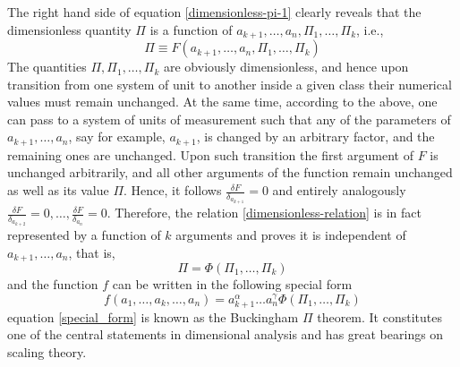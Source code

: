 The right hand side of equation \ref{dimensionless-pi-1} clearly reveals that the dimensionless quantity $\Pi$ is a function of $a_{k+1},\ldots,a_n,\Pi_1,\ldots,\Pi_k$, i.e.,
\begin{equation}
	\Pi \equiv F(a_{k+1}, \ldots, a_n, \Pi_1,\ldots,\Pi_k)
	\label{dimensionless-relation}
\end{equation}
The quantities $\Pi, \Pi_1,\ldots, \Pi_k$ are obviously dimensionless, and hence upon transition from one system of unit to another inside a given class their numerical values must remain unchanged. At the same time, according to the above, one can pass to a system of units of measurement such that any of the parameters of $a_{k+1}, \ldots, a_n$, say for example, $a_{k+1}$, is changed by an arbitrary factor, and the remaining ones are unchanged. Upon such transition the first argument of $F$ is unchanged arbitrarily, and all other arguments of the function remain unchanged as well as its value $\Pi$. Hence, it follows $\frac{\delta F}{\delta_{a_{k+1}}} = 0$ and entirely analogously $\frac{\delta F}{\delta_{a_{k+2}}} = 0, \ldots , \frac{\delta F}{\delta_{a_n}}=0$. Therefore, the relation \ref{dimensionless-relation} is in fact represented by a function of $k$ arguments and proves it is independent of $a_{k+1}, \ldots, a_n$, that is,
\begin{equation}
	\Pi = \Phi(\Pi_1, \ldots, \Pi_k)
\end{equation}
and the function $f$ can be written in the following special form
\begin{equation}
f(a_1,\ldots,a_k,\ldots,a_n) = a^{\alpha}_{k+1} \ldots a^{\gamma}_n \Phi(\Pi_1, \ldots, \Pi_k)
\label{special_form}
\end{equation}
equation \ref{special_form} is known as the Buckingham $\Pi$ theorem. It constitutes one of the central statements in dimensional analysis and has great bearings on scaling theory. 
